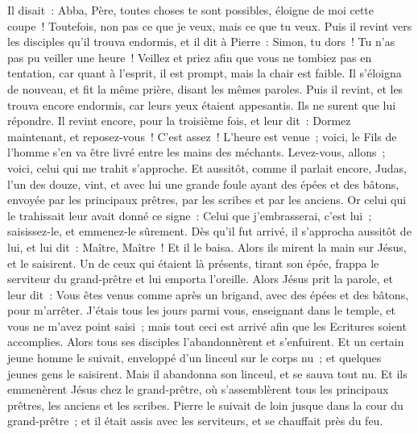 \begin{multicols}{2}
Il disait~: Abba, Père, toutes choses te sont possibles, éloigne de moi cette coupe~! Toutefois, non pas ce que je veux, mais ce que tu veux.
Puis il revint vers les disciples qu'il trouva endormis, et il dit à Pierre~: Simon, tu dors~! Tu n'as pas pu veiller une heure~!
Veillez et priez afin que vous ne tombiez pas en tentation, car quant à l'esprit, il est prompt, mais la chair est faible.
Il s'éloigna de nouveau, et fit la même prière, disant les mêmes paroles.
Puis il revint, et les trouva encore endormis, car leurs yeux étaient appesantis. Ils ne surent que lui répondre.
Il revint encore, pour la troisième fois, et leur dit~: Dormez maintenant, et reposez-vous~! C'est assez~! L'heure est venue~; voici, le Fils de l'homme s'en va être livré entre les mains des méchants.
Levez-vous, allons~; voici, celui qui me trahit s'approche.
Et aussitôt, comme il parlait encore, Judas, l'un des douze, vint, et avec lui une grande foule ayant des épées et des bâtons, envoyée par les principaux prêtres, par les scribes et par les anciens.
Or celui qui le trahissait leur avait donné ce signe~: Celui que j'embrasserai, c'est lui~; saisissez-le, et emmenez-le sûrement.
Dès qu'il fut arrivé, il s'approcha aussitôt de lui, et lui dit~: Maître, Maître~! Et il le baisa.
Alors ils mirent la main sur Jésus, et le saisirent.
Un de ceux qui étaient là présents, tirant son épée, frappa le serviteur du grand-prêtre et lui emporta l'oreille.
Alors Jésus prit la parole, et leur dit~: Vous êtes venus comme après un brigand, avec des épées et des bâtons, pour m'arrêter.
J'étais tous les jours parmi vous, enseignant dans le temple, et vous ne m'avez point saisi~; mais tout ceci est arrivé afin que les Ecritures soient accomplies.
Alors tous ses disciples l'abandonnèrent et s'enfuirent.
Et un certain jeune homme le suivait, enveloppé d'un linceul sur le corps nu~; et quelques jeunes gens le saisirent.
Mais il abandonna son linceul, et se sauva tout nu.
Et ils emmenèrent Jésus chez le grand-prêtre, où s'assemblèrent tous les principaux prêtres, les anciens et les scribes.
Pierre le suivait de loin jusque dans la cour du grand-prêtre~; et il était assis avec les serviteurs, et se chauffait près du feu.

\end{multicols}
